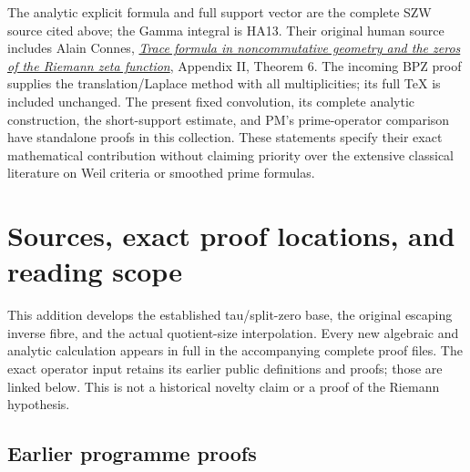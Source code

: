 \documentclass[
  10pt,
  a4paper,
]{article}
\begin{document}
The analytic explicit formula and full support vector are the complete
SZW source cited above; the Gamma integral is HA13. Their original human
source includes Alain Connes,
\href{https://arxiv.org/abs/math/9811068}{\emph{Trace formula in
noncommutative geometry and the zeros of the Riemann zeta function}},
Appendix II, Theorem 6. The incoming BPZ proof supplies the
translation/Laplace method with all multiplicities; its full TeX is
included unchanged. The present fixed convolution, its complete analytic
construction, the short-support estimate, and PM's prime-operator
comparison have standalone proofs in this collection. These statements
specify their exact mathematical contribution without claiming priority
over the extensive classical literature on Weil criteria or smoothed
prime formulas.

\clearpage

\section{Sources, exact proof locations, and reading
scope}\label{sources-exact-proof-locations-and-reading-scope}

This addition develops the established tau/split-zero base, the original
escaping inverse fibre, and the actual quotient-size interpolation.
Every new algebraic and analytic calculation appears in full in the
accompanying complete proof files. The exact operator input retains its
earlier public definitions and proofs; those are linked below. This is
not a historical novelty claim or a proof of the Riemann hypothesis.

\subsection{Earlier programme proofs}\label{earlier-programme-proofs}
\end{document}
